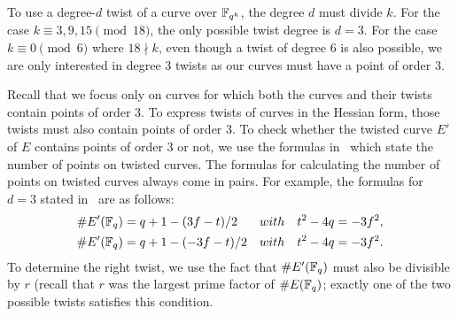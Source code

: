 To use a degree-$d$ twist of a curve over $\mathbb{F}_{q^{k}}$, the degree $d$ must divide $k$.
For the case $k \equiv 3,9,15 \pmod{18}$,
the only possible twist degree is $d = 3$.
For the case $k \equiv 0 \pmod{6}$ where $18 \nmid k$,
even though a twist of degree 6 is also possible, we are only interested in degree 3 twists as our curves must have a point of order 3.

Recall that we focus only on curves for which both the curves and their twists contain points of order 3.
To express twists of curves in the Hessian form,
those twists must also contain points of order 3.
To check whether the twisted curve $E'$ of $E$ contains points of order 3 or not,
we use the formulas in~\cite{2006/hess} which state the number of points on twisted curves.
The formulas for calculating the number of points on twisted curves always come in pairs.
For example, the formulas for $d = 3$ stated in~\cite{2006/hess} are as follows:
\begin{align*}
\# E' (\mathbb{F}_{q}) &= q + 1 - (3f - t) / 2 & with & \quad t^2 - 4q = -3f^2, \\
\# E' (\mathbb{F}_{q}) &= q + 1 - (-3f- t) / 2 & with & \quad t^2 - 4q = -3f^2.
\end{align*}
To determine the right twist,
we use the fact that $\#E'(\mathbb{F}_{q})$ must also be divisible by $r$ (recall that $r$ was the largest prime factor of $\# E(\mathbb{F}_{q})$; exactly one of the two possible twists satisfies this condition.



